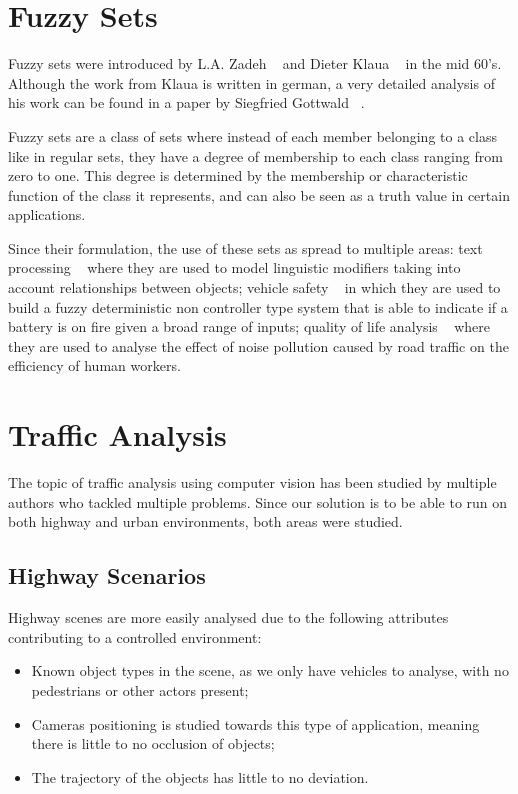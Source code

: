 \section{Fuzzy Sets}

Fuzzy sets were introduced by L.A. Zadeh ~\cite{zadeh_fuzzy_1965} and Dieter Klaua ~\cite{klaua_ansatz_1967} in the mid 60's. Although the work from Klaua is written in german, a very detailed analysis of his work can be found in a paper by Siegfried Gottwald ~\cite{gottwald_early_2010}.

Fuzzy sets are a class of sets where instead of each member belonging to a class like in regular sets, they have a degree of membership to each class ranging from zero to one. This degree is determined by the membership or characteristic function of the class it represents, and can also be seen as a truth value in certain applications. 

Since their formulation, the use of these sets as spread to multiple areas: text processing ~\cite{cock_modelling_2000} where they are used to model linguistic modifiers taking into account relationships between objects; vehicle safety ~\cite{dattathreya_detection_2012} in which they are used to build a fuzzy deterministic non controller type system that is able to indicate if a battery is on fire given a broad range of inputs; quality of life analysis ~\cite{pal_effect_2012} where they are used to analyse the effect of noise pollution caused by road traffic on the efficiency of human workers.

\section{Traffic Analysis}

The topic of traffic analysis using computer vision has been studied by multiple authors who tackled multiple problems. Since our solution is to be able to run on both highway and urban environments, both areas were studied.

\subsection{Highway Scenarios}

Highway scenes are more easily analysed due to the following attributes contributing to a controlled environment:

\begin{itemize}
	\item Known object types in the scene, as we only have vehicles to analyse, with no pedestrians or other actors present;
	\item Cameras positioning is studied towards this type of application, meaning there is little to no occlusion of objects;
	\item The trajectory of the objects has little to no deviation.
\end{itemize}

